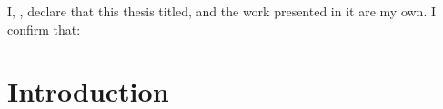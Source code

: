 \documentclass[
11pt, %
oneside, %
english, %
singlespacing, %
]{macthesis} %
\begin{document}
\listoffigures %

\listoftables %



\begin{declaration}
\addchaptertocentry{\authorshipname}

\noindent I, \authorname, declare that this thesis titled, \emph{\ttitle} and the work presented in it are my own. I confirm that:



\end{declaration}


\label{lastoffront}
\clearpage


\mainmatter %
\pagestyle{thesis}
\hypertarget{introduction}{%
\chapter{Introduction}\label{introduction}}
\end{document}
